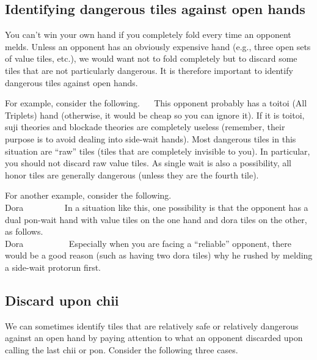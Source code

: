 {{\subsection{Identifying dangerous tiles against open hands}

You can't win your own hand if you completely fold every time an opponent melds. Unless an opponent has an obviously expensive hand (e.g., three open sets of value tiles, etc.), we would want not to fold completely but to discard some tiles that are not particularly dangerous. It is therefore important to identify dangerous tiles against open hands. 

\bigskip
For example, consider the following. 
\bp
{}
\rfa\fa\fa~~
\ep
This opponent probably has a {\jap toitoi} (All Triplets) hand (otherwise, it would be cheap so you can ignore it). If it is {\jap toitoi}, {\jap suji} theories and blockade theories are completely useless (remember, their purpose is to avoid dealing into side-wait hands). 
Most dangerous tiles in this situation are ``raw'' tiles (tiles that are completely invisible to you). In particular, you should not discard raw value tiles. As single wait is also a possibility, all honor tiles are generally dangerous (unless they are the fourth tile). 

\bigskip
For another example, consider the following. 
\vspace{-10pt}
\bp
{}
~~~\\
\hfill\footnotesize{{\jap Dora}~~~~~~~~~}
\ep
In a situation like this, one possibility is that the opponent has a dual {\jap pon}-wait hand with value tiles on the one hand and {\jap dora} tiles on the other, as follows. 
\bp
{}\fa\fa
~~~~\\
\hfill\footnotesize{{\jap Dora}~~~~~~~~~~}
\ep
Especially when you are facing a ``reliable'' opponent, there would be a good reason (such as having two {\jap dora} tiles) why he rushed by melding a side-wait protorun first. 

\newpage
\subsection{Discard upon {\jap chii}}

We can sometimes identify tiles that are relatively safe or relatively dangerous against an open hand by paying attention to what an opponent discarded upon calling the last {\jap chii} or {\jap pon}. Consider the following three cases. 

}}
